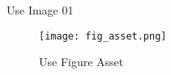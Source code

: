 \documentclass{article}
\begin{document}
    Use Image 01
    \begin{figure}[h!]
        \centering
        \texttt{[image: fig\_asset.png]}
        \caption{Use Figure Asset}
    \end{figure}
\end{document}
